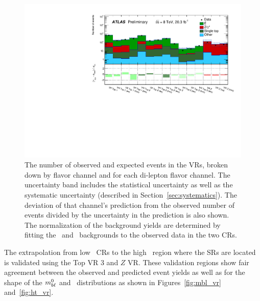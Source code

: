 \begin{figure}[ht]
\centering
\includegraphics[width=\textwidth]{figs/blstop/histpull_VR_detailed.pdf}
\caption{The number of observed and expected events in the VRs,
  broken down by flavor channel and for each di-lepton flavor channel.
  The uncertainty band includes the statistical uncertainty as well as the
  systematic uncertainty (described in Section~\ref{sec:systematics}).
  The deviation of that channel's prediction from the observed number of events
  divided by the uncertainty in the prediction is also shown.
  The normalization of the background yields are determined
  by fitting the \TTBAR\ and \ZGAMMAJETS\ backgrounds to the observed
  data in the two CRs.
}
\label{fig:pull_dist_vr}
\end{figure}

The extrapolation from low \HT\ CRs to the high \HT\ region
where the SRs are located is validated using the Top VR 3
and $Z$ VR. These validation regions show fair
agreement between the observed and predicted event yields as well as
for the shape of the $m_{b\ell}^{0}$ and \HT\ distributions as shown in
Figures~\ref{fig:mbl_vr} and~\ref{fig:ht_vr}.

